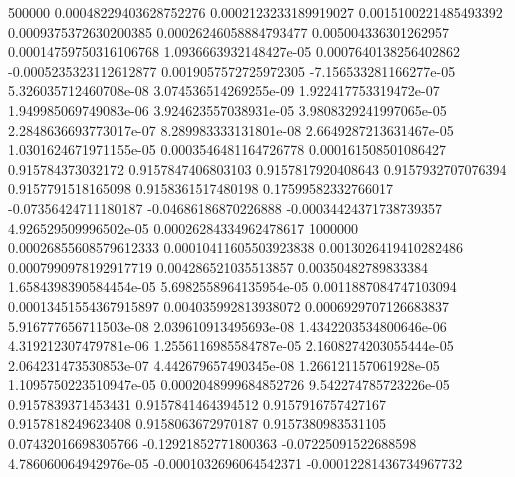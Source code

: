 {500000 0.00048229403628752276 0.0002123233189919027 0.0015100221485493392 0.0009375372630200385 0.00026246058884793477 0.005004336301262957 0.00014759750316106768 1.0936663932148427e-05 0.0007640138256402862 -0.0005235323112612877 0.0019057572725972305 -7.156533281166277e-05 5.326035712460708e-08 3.074536514269255e-09 1.922417753319472e-07 1.949985069749083e-06 3.924623557038931e-05 3.9808329241997065e-05 2.2848636693773017e-07 8.289983333131801e-08 2.6649287213631467e-05 1.0301624671971155e-05 0.0003546481164726778 0.000161508501086427 0.915784373032172 0.9157847406803103 0.9157817920408643 0.9157932707076394 0.9157791518165098 0.9158361517480198 0.17599582332766017 -0.07356424711180187 -0.04686186870226888 -0.00034424371738739357 4.926529509996502e-05 0.00026284334962478617
1000000 0.00026855608579612333 0.00010411605503923838 0.0013026419410282486 0.0007990978192917719 0.004286521035513857 0.00350482789833384 1.6584398390584454e-05 5.6982558964135954e-05 0.0011887084747103094 0.00013451554367915897 0.004035992813938072 0.0006929707126683837 5.916777656711503e-08 2.039610913495693e-08 1.4342203534800646e-06 4.319212307479781e-06 1.2556116985584787e-05 2.1608274203055444e-05 2.064231473530853e-07 4.442679657490345e-08 1.266121157061928e-05 1.1095750223510947e-05 0.0002048999684852726 9.542274785723226e-05 0.9157839371453431 0.9157841464394512 0.9157916757427167 0.9157818249623408 0.9158063672970187 0.9157380983531105 0.07432016698305766 -0.12921852771800363 -0.07225091522688598 4.786060064942976e-05 -0.0001032696064542371 -0.00012281436734967732
}\dataA


